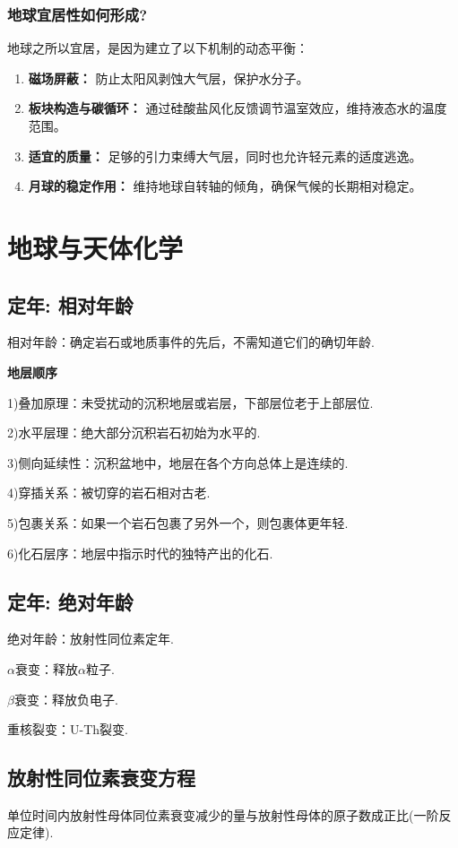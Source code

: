 \documentclass[12pt,a4paper]{article}
\begin{document}
	\subsubsection{地球宜居性如何形成?}
	地球之所以宜居，是因为建立了以下机制的动态平衡：
	\begin{enumerate}
		\item \textbf{磁场屏蔽：} 防止太阳风剥蚀大气层，保护水分子。
		\item \textbf{板块构造与碳循环：} 通过硅酸盐风化反馈调节温室效应，维持液态水的温度范围。
		\item \textbf{适宜的质量：} 足够的引力束缚大气层，同时也允许轻元素的适度逃逸。
		\item \textbf{月球的稳定作用：} 维持地球自转轴的倾角，确保气候的长期相对稳定。
	\end{enumerate}
	
	\section{地球与天体化学}
	\subsection{定年: 相对年龄}
	相对年龄：确定岩石或地质事件的先后，不需知道它们的确切年龄.
	
	\textbf{地层顺序}
	
	1)叠加原理：未受扰动的沉积地层或岩层，下部层位老于上部层位.
	
	2)水平层理：绝大部分沉积岩石初始为水平的.
	
	3)侧向延续性：沉积盆地中，地层在各个方向总体上是连续的.
	
	4)穿插关系：被切穿的岩石相对古老.
	
	5)包裹关系：如果一个岩石包裹了另外一个，则包裹体更年轻.
	
	6)化石层序：地层中指示时代的独特产出的化石.
	
	\subsection{定年: 绝对年龄}
	
	绝对年龄：放射性同位素定年.
	
	$\alpha$衰变：释放$\alpha$粒子.
	
	$\beta$衰变：释放负电子.
	
	重核裂变：U-Th裂变.
	
	\subsection{放射性同位素衰变方程}
	单位时间内放射性母体同位素衰变减少的量与放射性母体的原子数成正比(一阶反应定律).
	
\end{document}
